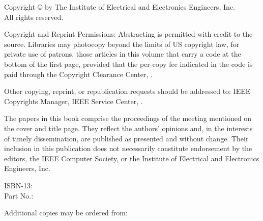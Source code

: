 
\clearpage
\thispagestyle{empty}

{\small
\begin{center}
Copyright \copyright{} \the\year{}
by The Institute of Electrical and Electronics Engineers, Inc.\\
All rights reserved.
\end{center}

Copyright and Reprint Permissions: Abstracting is permitted with credit to the source. Libraries may photocopy beyond the limits of US copyright law, for private use of patrons, those articles in this volume that carry a code at the bottom of the first page, provided that the per-copy fee indicated in the code is paid through the Copyright Clearance Center,
.

Other copying, reprint, or republication requests should be addressed to: IEEE Copyrights Manager, IEEE Service Center,
.

The papers in this book comprise the proceedings of the meeting mentioned on the cover and title page. They reflect the authors’ opinions and, in the interests of timely dissemination, are published as presented and without change. Their inclusion in this publication does not necessarily constitute endorsement by the editors, the IEEE Computer Society, or the Institute of Electrical and Electronics Engineers, Inc.

\begin{center}
ISBN-13:  \\
Part No.: 
\end{center}

\begin{center}
Additional copies may be ordered from:
\end{center}

}
